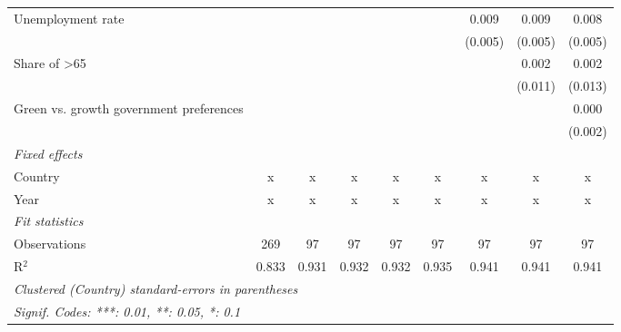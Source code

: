 \begin{table}[htbp]
\begin{tabular}{lcccccccc}
      Unemployment rate                       &         &             &             &             &              & 0.009        & 0.009        & 0.008\\   
                                              &         &             &             &             &              & (0.005)      & (0.005)      & (0.005)\\   
      Share of >65                            &         &             &             &             &              &              & 0.002        & 0.002\\   
                                              &         &             &             &             &              &              & (0.011)      & (0.013)\\   
      Green vs. growth government preferences &         &             &             &             &              &              &              & 0.000\\   
                                              &         &             &             &             &              &              &              & (0.002)\\   
      \emph{Fixed effects}\\
      Country                                 & x       & x           & x           & x           & x            & x            & x            & x\\  
      Year                                    & x       & x           & x           & x           & x            & x            & x            & x\\  
      \midrule \emph{Fit statistics}\\
      Observations                            & 269     & 97          & 97          & 97          & 97           & 97           & 97           & 97\\  
      R$^2$                                   & 0.833   & 0.931       & 0.932       & 0.932       & 0.935        & 0.941        & 0.941        & 0.941\\  
      \midrule
      \multicolumn{9}{l}{\emph{Clustered (Country) standard-errors in parentheses}}\\
      \multicolumn{9}{l}{\emph{Signif. Codes: ***: 0.01, **: 0.05, *: 0.1}}\\
   \end{tabular}
\end{table}


